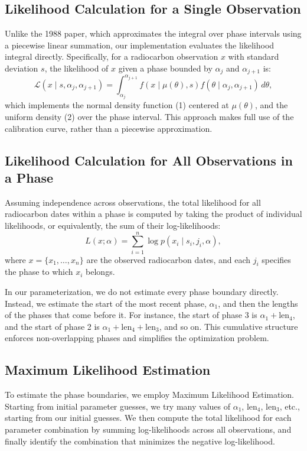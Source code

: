 \documentclass{article}
\begin{document}
\subsection{Likelihood Calculation for a Single Observation}
Unlike the 1988 paper, which approximates the integral over phase intervals using a piecewise linear summation, our implementation evaluates the likelihood integral directly. Specifically, for a radiocarbon observation $x$ with standard deviation $s$, the likelihood of $x$ given a phase bounded by $\alpha_j$ and $\alpha_{j+1}$ is:
\[
\mathcal{L}(x \mid s, \alpha_j, \alpha_{j+1}) = \int_{\alpha_j}^{\alpha_{j+1}} f(x \mid \mu(\theta), s) f(\theta \mid \alpha_j, \alpha_{j+1}) \, d\theta,
\]
which implements the normal density function (1) centered at $\mu(\theta)$, and the uniform density (2) over the phase interval.
This approach makes full use of the calibration curve, rather than a piecewise approximation.

\subsection{Likelihood Calculation for All Observations in a Phase}
Assuming independence across observations, the total likelihood for all radiocarbon dates within a phase is computed by taking the product of individual likelihoods, or equivalently, the sum of their log-likelihoods:
\[
L(x; \alpha) = \sum_{i=1}^n \log p(x_i \mid s_i, j_i, \alpha),
\]
where $x = \{x_1, \dots, x_n\}$ are the observed radiocarbon dates, and each $j_i$ specifies the phase to which $x_i$ belongs.

In our parameterization, we do not estimate every phase boundary directly. Instead, we estimate the start of the most recent phase, $\alpha_1$, and then the lengths of the phases that come before it.  For instance, the start of phase 3 is $\alpha_1 + \text{len}_4$, and the start of phase 2 is $\alpha_1 + \text{len}_4 + \text{len}_3$, and so on. This cumulative structure enforces non-overlapping phases and simplifies the optimization problem.


\subsection{Maximum Likelihood Estimation}
To estimate the phase boundaries, we employ Maximum Likelihood Estimation. Starting from initial parameter guesses, we try many values of $\alpha_1$, $\text{len}_4$, $\text{len}_3$, etc., starting from our initial guesses. We then compute the total likelihood for each parameter combination by summing log-likelihoods across all observations, and finally identify the combination that minimizes the negative log-likelihood.
\end{document}
